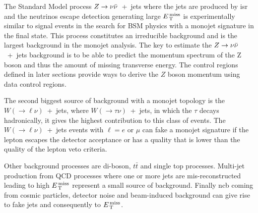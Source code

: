 The Standard Model process $Z \rightarrow \nu \bar{\nu}$~+~jets where the jets are produced by
\gls{isr} and the neutrinos escape detection generating large $E_\mathrm{\, T}^\mathrm{\, miss}$ is
experimentally similar to signal events in the search for BSM physics with a
monojet signature in the final state. This process constitutes an irreducible
background and is the largest background in the monojet analysis. The key to
estimate the $Z \rightarrow \nu \bar{\nu}$~+~jets background is to be able to predict the momentum
spectrum of the Z boson and thus the amount of missing transverse energy. The
control regions defined in later sections provide ways to derive the $Z$ boson
momentum using data control regions.

The second biggest source of background with a monojet topology is the
$W (\rightarrow \ell \nu)$~+~jets, where $W (\rightarrow \tau \nu)$~+~jets, in
which the $\tau$ decays hadronically, it gives the highest contribution to this
class of events. The $W (\rightarrow \ell \nu)$~+~jets events with $\ell = e$ or
$\mu$ can fake a monojet signature if the lepton escapes the detector acceptance
or has a quality that is lower than the quality of the lepton veto criteria.

Other background processes are di-boson, $t \bar{t}$ and single top
processes. Multi-jet production from QCD processes where one or more jets are
mis-reconstructed leading to high $E_\mathrm{\, T}^\mathrm{\, miss}$ represent a small source of
background. Finally \gls{ncb} coming from cosmic particles, detector noise and
beam-induced background can give rise to fake jets and consequently to $E_\mathrm{\, T}^\mathrm{\, miss}$.
